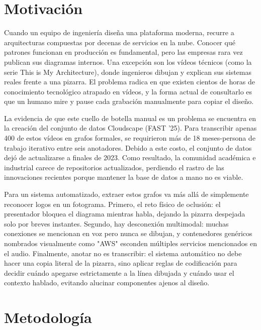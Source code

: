\documentclass[a4paper, twocolumn, 10pt]{IEEEtran}
\begin{document}
\section{Motivación}
Cuando un equipo de ingeniería diseña una plataforma moderna, recurre a arquitecturas compuestas por decenas de servicios en la nube. Conocer qué patrones funcionan en producción es fundamental, pero las empresas rara vez publican sus diagramas internos. Una excepción son los vídeos técnicos (como la serie This is My Architecture), donde ingenieros dibujan y explican sus sistemas reales frente a una pizarra. El problema radica en que existen cientos de horas de conocimiento tecnológico atrapado en vídeos, y la forma actual de consultarlo es que un humano mire y pause cada grabación manualmente para copiar el diseño.
 
La evidencia de que este cuello de botella manual es un problema se encuentra en la creación del conjunto de datos Cloudscape (FAST '25). Para transcribir apenas 400 de estos vídeos en grafos formales, se requirieron más de 18 meses-persona de trabajo iterativo entre seis anotadores. Debido a este costo, el conjunto de datos dejó de actualizarse a finales de 2023. Como resultado, la comunidad académica e industrial carece de repositorios actualizados, perdiendo el rastro de las innovaciones recientes porque mantener la base de datos a mano no es viable.
 
Para un sistema automatizado, extraer estos grafos va más allá de simplemente reconocer logos en un fotograma. Primero, el reto físico de oclusión: el presentador bloquea el diagrama mientras habla, dejando la pizarra despejada solo por breves instantes. Segundo, hay desconexión multimodal: muchas conexiones se mencionan en voz pero nunca se dibujan, y contenedores genéricos nombrados visualmente como "AWS" esconden múltiples servicios mencionados en el audio. Finalmente, anotar no es transcribir: el sistema automático no debe hacer una copia literal de la pizarra, sino aplicar reglas de codificación para decidir cuándo apegarse estrictamente a la línea dibujada y cuándo usar el contexto hablado, evitando alucinar componentes ajenos al diseño.
 
\section{Metodología}
 
\end{document}
